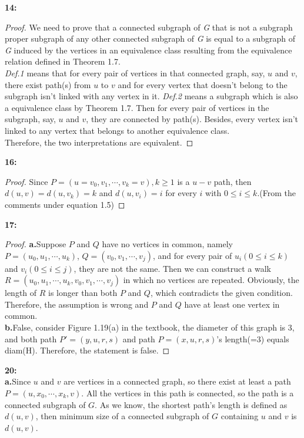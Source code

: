 \documentclass[11pt]{article}
\begin{document}
\textbf{14:}
\begin{proof}
We need to prove that a connected subgraph of \emph{G} that is not a subgraph proper subgraph of any other connected subgraph of \emph{G} is equal to a subgraph of \emph{G} induced by the vertices in an equivalence class resulting from the equivalence relation defined in Theorem 1.7.\\
\emph{Def.1} means that for every pair of vertices in that connected graph, say, $u$ and $v$, there exist path(s) from $u$ to $v$ and for every vertex that doesn't belong to the subgraph isn't linked with any vertex in it. \emph{Def.2} means a subgraph which is also a equivalence class by Theorem 1.7. Then for every pair of vertices in the subgraph, say, $u$ and $v$, they are connected by path(s). Besides, every vertex isn't linked to any vertex that belongs to another equivalence class.\\
Therefore, the two interpretations are equivalent.
\end{proof}
\textbf{16:}
\begin{proof}
Since $P=(u=v_0,v_1,\cdots,v_k=v),k\ge 1$ is a $u-v$ path, then $d(u,v)=d(u,v_k)=k$ and $d(u,v_i)=i$ for every $i$ with $0\le i\le k.$(From the comments under equation 1.5)  
\end{proof}
\textbf{17:}
\begin{proof}
\textbf{a.}Suppose $P$ and $Q$ have no vertices in common, namely $P=(u_0,u_1,\cdots,u_k)$,  $Q=(v_0,v_1,\cdots,v_j)$, and for every pair of $u_i(0\le i\le k)$ and $v_i(0\le i\le j)$, they are not the same. Then we can construct a walk $R=(u_0,u_1,\cdots,u_k,v_0,v_1,\cdots,v_j)$ in which no vertices are repeated. Obviously, the length of $R$ is longer than both $P$ and $Q$, which contradicts the given condition. Therefore, the assumption is wrong and $P$ and $Q$ have at least one vertex in common.\\
\textbf{b.}False, consider Figure 1.19(a) in the textbook, the diameter of this graph is 3, and both path $P'=(y,u,r,s)$ and path $P=(x,u,r,s)$'s length(=3) equals diam(H). Therefore, the statement is false.
\end{proof}
\textbf{20:}\\
\textbf{a.}Since $u$ and $v$ are vertices in a connected graph, so there exist at least a path $P=(u,x_0,\cdots,x_k,v)$. All the vertices in this path is connected, so the path is a connected subgraph of $G$. As we know, the shortest path's length is defined as $d(u,v)$, then minimum size of a connected subgraph of $G$ containing $u$ and $v$ is $d(u,v)$.\\
\end{document}
